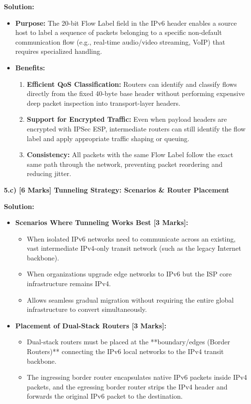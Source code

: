 \documentclass[11pt,a4paper]{article}
\begin{document}
\textbf{Solution:}
\begin{itemize}
    \item \textbf{Purpose:} The 20-bit Flow Label field in the IPv6 header enables a source host to label a sequence of packets belonging to a specific non-default communication flow (e.g., real-time audio/video streaming, VoIP) that requires specialized handling.
    \item \textbf{Benefits:}
    \begin{enumerate}
        \item \textbf{Efficient QoS Classification:} Routers can identify and classify flows directly from the fixed 40-byte base header without performing expensive deep packet inspection into transport-layer headers.
        \item \textbf{Support for Encrypted Traffic:} Even when payload headers are encrypted with IPSec ESP, intermediate routers can still identify the flow label and apply appropriate traffic shaping or queuing.
        \item \textbf{Consistency:} All packets with the same Flow Label follow the exact same path through the network, preventing packet reordering and reducing jitter.
    \end{enumerate}
\end{itemize}

\vspace{0.2cm}
\textbf{5.c) [6 Marks] Tunneling Strategy: Scenarios \& Router Placement}

\textbf{Solution:}
\begin{itemize}
    \item \textbf{Scenarios Where Tunneling Works Best [3 Marks]:}
    \begin{itemize}
        \item When isolated IPv6 networks need to communicate across an existing, vast intermediate IPv4-only transit network (such as the legacy Internet backbone).
        \item When organizations upgrade edge networks to IPv6 but the ISP core infrastructure remains IPv4.
        \item Allows seamless gradual migration without requiring the entire global infrastructure to convert simultaneously.
    \end{itemize}
    \item \textbf{Placement of Dual-Stack Routers [3 Marks]:}
    \begin{itemize}
        \item Dual-stack routers must be placed at the **boundary/edges (Border Routers)** connecting the IPv6 local networks to the IPv4 transit backbone.
        \item The ingressing border router encapsulates native IPv6 packets inside IPv4 packets, and the egressing border router strips the IPv4 header and forwards the original IPv6 packet to the destination.
    \end{itemize}
\end{itemize}
\end{document}
